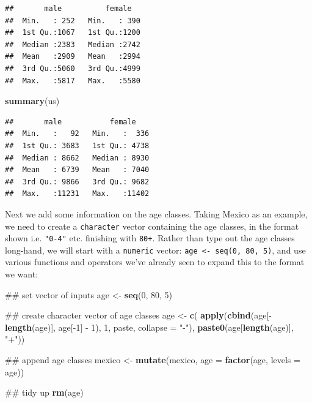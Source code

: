 \documentclass[]{book}
\newenvironment{Shaded}{\begin{snugshade}}{\end{snugshade}}
\newcommand{\KeywordTok}[1]{\textcolor[rgb]{0.13,0.29,0.53}{\textbf{{#1}}}}
\newcommand{\DataTypeTok}[1]{\textcolor[rgb]{0.13,0.29,0.53}{{#1}}}
\newcommand{\DecValTok}[1]{\textcolor[rgb]{0.00,0.00,0.81}{{#1}}}
\newcommand{\StringTok}[1]{\textcolor[rgb]{0.31,0.60,0.02}{{#1}}}
\newcommand{\NormalTok}[1]{{#1}}
\theoremstyle{definition}
\theoremstyle{definition}
\theoremstyle{definition}
\theoremstyle{remark}
\begin{document}
\begin{verbatim}
##       male          female    
##  Min.   : 252   Min.   : 390  
##  1st Qu.:1067   1st Qu.:1200  
##  Median :2383   Median :2742  
##  Mean   :2909   Mean   :2994  
##  3rd Qu.:5060   3rd Qu.:4999  
##  Max.   :5817   Max.   :5580
\end{verbatim}

\begin{Shaded}
\begin{Highlighting}[]
\KeywordTok{summary}\NormalTok{(us)}
\end{Highlighting}
\end{Shaded}

\begin{verbatim}
##       male           female     
##  Min.   :   92   Min.   :  336  
##  1st Qu.: 3683   1st Qu.: 4738  
##  Median : 8662   Median : 8930  
##  Mean   : 6739   Mean   : 7040  
##  3rd Qu.: 9866   3rd Qu.: 9682  
##  Max.   :11231   Max.   :11402
\end{verbatim}

Next we add some information on the age classes. Taking Mexico as an
example, we need to create a \texttt{character} vector containing the
age classes, in the format shown i.e. \texttt{"0-4"} etc. finishing with
\texttt{80+}. Rather than type out the age classes long-hand, we will
start with a \texttt{numeric} vector:
\texttt{age\ \textless{}-\ seq(0,\ 80,\ 5)}, and use various functions
and operators we've already seen to expand this to the format we want:

\begin{Shaded}
\begin{Highlighting}[]
\NormalTok{## set vector of inputs}
\NormalTok{age <-}\StringTok{ }\KeywordTok{seq}\NormalTok{(}\DecValTok{0}\NormalTok{, }\DecValTok{80}\NormalTok{, }\DecValTok{5}\NormalTok{)}

\NormalTok{## create character vector of age classes}
\NormalTok{age <-}\StringTok{ }\KeywordTok{c}\NormalTok{(}
    \KeywordTok{apply}\NormalTok{(}\KeywordTok{cbind}\NormalTok{(age[-}\KeywordTok{length}\NormalTok{(age)], age[-}\DecValTok{1}\NormalTok{] -}\StringTok{ }\DecValTok{1}\NormalTok{), }\DecValTok{1}\NormalTok{, paste, }\DataTypeTok{collapse =} \StringTok{"-"}\NormalTok{),}
    \KeywordTok{paste0}\NormalTok{(age[}\KeywordTok{length}\NormalTok{(age)], }\StringTok{"+"}\NormalTok{))}

\NormalTok{## append age classes}
\NormalTok{mexico <-}\StringTok{ }\KeywordTok{mutate}\NormalTok{(mexico, }\DataTypeTok{age =} \KeywordTok{factor}\NormalTok{(age, }\DataTypeTok{levels =} \NormalTok{age))}

\NormalTok{## tidy up}
\KeywordTok{rm}\NormalTok{(age)}
\end{Highlighting}
\end{Shaded}
\end{document}
